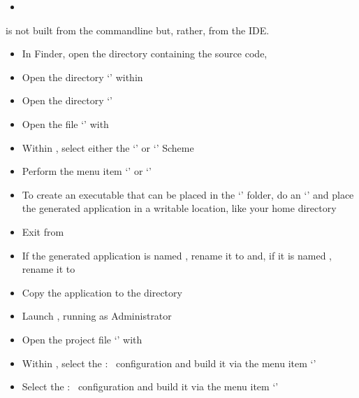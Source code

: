\begin{itemize}
\item\TBD
\end{itemize}
\tertiaryEnd
\secondaryEnd
{}
\textit{\MMMU} is not built from the command\longDash{}line but, rather, from the IDE.
\begin{itemize}
\item In Finder, open the directory containing the \mplusm{} source code,
\item\exSp{}Open the directory `' within
\item\exSp{}Open the directory `'
\item\exSp{}Open the file `' with 
\item\exSp{}Within , select either the `' or
`' Scheme
\item\exSp{}Perform the menu item `' or
`'
\item\exSp{}To create an executable that can be placed in the `'
folder, do an `'
and place the generated application in a writable location, like your home directory
\item\exSp{}Exit from 
\item\exSp{}If the generated application is named , rename
it to  and, if it is named ,
rename it to 
\item\exSp{}Copy the  application to the 
directory
\end{itemize}
\tertiaryEnd
{}
\begin{itemize}
\item Launch , running as Administrator
\item\exSp{}Open the project file
`' with
\item\exSp{}Within , select the  :\ 
configuration and build it via the menu item
`'
\item\exSp{}Select the  :\  configuration and build it via
the menu item `'
\end{itemize}
